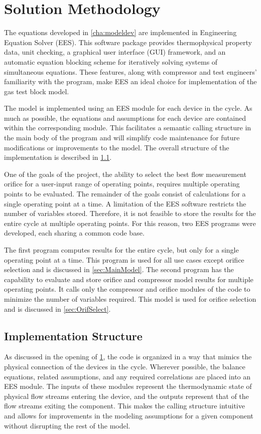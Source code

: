 \chapter{Solution Methodology} \label{cha:solnmethod}

The equations developed in \cref{cha:modeldev} are implemented in
Engineering Equation Solver (EES). 
This software package provides thermophysical property data, unit checking, 
a graphical user interface (GUI) framework, and an automatic equation 
blocking scheme for iteratively solving systems of simultaneous equations. 
These features, along with compressor and test engineers' familiarity with the program, 
make EES an ideal choice for implementation of the gas test block model.

The model is implemented using an EES module for each device in the cycle. 
As much as possible, the equations and assumptions for each device are contained
within the corresponding module.
This facilitates a semantic calling structure in the main body of the program 
and will simplify code maintenance for future modifications or improvements 
to the model.
The overall structure of the implementation is described in \cref{sec:Overall}.

One of the goals of the project, the ability to select the best flow measurement
orifice for a user-input range of operating points, requires multiple operating points
to be evaluated.
The remainder of the goals consist of calculations for a single operating point at a time.
A limitation of the EES software restricts the number of variables stored.
Therefore, it is not feasible to store the results for the entire cycle at multiple operating points.
For this reason, two EES programs were developed, each sharing a common code base. 

The first program computes results for the entire cycle, but only 
for a single operating point at a time.
This program is used for all use cases except orifice selection
and is discussed in \cref{sec:MainModel}.
The second program has the capability to evaluate and store orifice and 
compressor model results for multiple operating points.
It calls only the compressor and orifice modules of the code to minimize the number of variables required.
This model is used for orifice selection and is discussed in \cref{sec:OrifSelect}.

\section{Implementation Structure} \label{sec:Overall}
As discussed in the opening of \cref{cha:solnmethod}, the code is organized
in a way that mimics the physical connection of the devices in the cycle.
Wherever possible, the balance equations, related assumptions, and any required
correlations are placed into an EES module.
The inputs of these modules represent the thermodynamic state of physical flow streams entering
the device, and the outputs represent that of the flow streams exiting the component.
This makes the calling structure intuitive and allows for improvements in the
modeling assumptions for a given component without disrupting the rest of the model.

